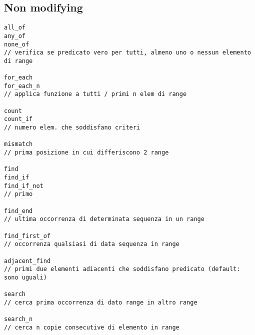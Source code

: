 \documentclass[10pt, oneside]{Book}
\begin{document}
\subsection{Non modifying}
\begin{verbatim}
all_of
any_of
none_of
// verifica se predicato vero per tutti, almeno uno o nessun elemento di range

for_each
for_each_n
// applica funzione a tutti / primi n elem di range

count
count_if
// numero elem. che soddisfano criteri

mismatch
// prima posizione in cui differiscono 2 range

find
find_if
find_if_not
// primo 

find_end
// ultima occorrenza di determinata sequenza in un range

find_first_of
// occorrenza qualsiasi di data sequenza in range

adjacent_find
// primi due elementi adiacenti che soddisfano predicato (default: sono uguali)

search
// cerca prima occorrenza di dato range in altro range

search_n
// cerca n copie consecutive di elemento in range
\end{verbatim}
\end{document}
